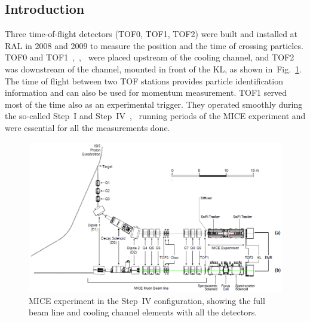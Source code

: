 
\subsection{Introduction}
\label{SubSect:TOF_Intro}

Three time-of-flight detectors (TOF0, TOF1, TOF2) were built and
installed at RAL in 2008 and 2009 to measure the position and the time
of crossing particles.  TOF0 and
TOF1~\cite{NOTE145},~\cite{NOTE241},~\cite{2010NIMPA.615...14B} were
placed upstream of the cooling channel, and TOF2~\cite{NOTE286} was
downstream of the channel, mounted in front of the KL, as shown
in~Fig.~\ref{fig:BL}.  The time of flight between two TOF stations
provides particle identification information and can also be used for
momentum measurement. TOF1 served most of the time also as an
experimental trigger. They operated smoothly during the so-called
Step~I and Step~IV~\cite{Rajaram:2015bra},~\cite{2015ehep.confE.521B}
running periods of the MICE experiment and were essential for all the
measurements done.

\begin{figure}[!ht]
  \begin{center}
    \includegraphics[width=0.8\columnwidth]{BL.png}
    \caption{MICE experiment in the Step~IV configuration, showing the full beam line and cooling channel elements with all the detectors.}
    \label{fig:BL}
  \end{center}
\end{figure}

